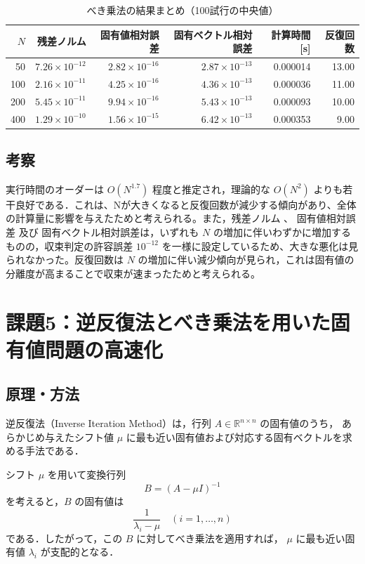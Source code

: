 \documentclass[a4paper,11pt]{ltjsarticle}
\begin{document}
\begin{table}[H]
\centering
\caption{べき乗法の結果まとめ（100試行の中央値）}
\label{tab:exp3_summary}
\begin{tabular}{r|r|r|r|r|r}
\hline
$N$ & 残差ノルム & 固有値相対誤差 & 固有ベクトル相対誤差 & 計算時間 [s] & 反復回数 \\
\hline
50  & $7.26\times10^{-12}$ & $2.82\times10^{-16}$ & $2.87\times10^{-13}$ & 0.000014 & 13.00 \\
100 & $2.16\times10^{-11}$ & $4.25\times10^{-16}$ & $4.36\times10^{-13}$ & 0.000036 & 11.00 \\
200 & $5.45\times10^{-11}$ & $9.94\times10^{-16}$ & $5.43\times10^{-13}$ & 0.000093 & 10.00 \\
400 & $1.29\times10^{-10}$ & $1.56\times10^{-15}$ & $6.42\times10^{-13}$ & 0.000353 & 9.00 \\
\hline
\end{tabular}
\end{table}


\subsection{考察}
実行時間のオーダーは $O(N^1.7)$ 程度と推定され，理論的な $O(N^2)$ よりも若干良好である．これは、Nが大きくなると反復回数が減少する傾向があり、全体の計算量に影響を与えたためと考えられる。また，残差ノルム 、 固有値相対誤差 及び 固有ベクトル相対誤差は，いずれも $N$ の増加に伴いわずかに増加するものの，収束判定の許容誤差 $10^{-12}$ を一様に設定しているため、大きな悪化は見られなかった。反復回数は $N$ の増加に伴い減少傾向が見られ，これは固有値の分離度が高まることで収束が速まったためと考えられる。

\section{課題5：逆反復法とべき乗法を用いた固有値問題の高速化}
\subsection{原理・方法}

逆反復法（Inverse Iteration Method）は，行列 $A \in \mathbb{R}^{n\times n}$ の固有値のうち，
あらかじめ与えたシフト値 $\mu$ に最も近い固有値および対応する固有ベクトルを求める手法である．

シフト $\mu$ を用いて変換行列
\[
B = (A - \mu I)^{-1}
\]
を考えると，$B$ の固有値は
\[
\frac{1}{\lambda_i - \mu} \quad (i = 1, \ldots, n)
\]
である．したがって，この $B$ に対してべき乗法を適用すれば，
$\mu$ に最も近い固有値 $\lambda_i$ が支配的となる．
\end{document}

